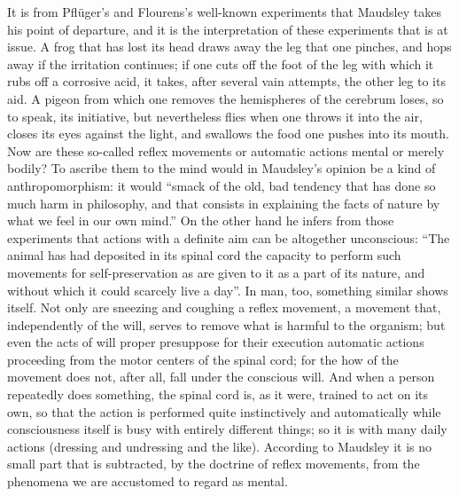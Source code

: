 \documentclass[12pt,a4paper,openany]{book}
\newcommand{\opage}[1]{\marginnote{\footnotesize\textit{[#1]}}}
\begin{document}
It is from Pflüger's and Flourens's well-known experiments that
Maudsley takes his point of departure, and it is the interpretation
of these experiments that is at issue. A frog that has
lost its head draws away the leg that one pinches, and
hops away if the irritation continues; if one cuts off the foot
of the leg with which it rubs off a corrosive acid,
it takes, after several vain attempts, the other leg
to its aid. A pigeon from which one removes the hemispheres
of the cerebrum loses, so to speak, its initiative, but nevertheless flies
when one throws it into the air, closes its eyes against the light,
and swallows the food one pushes into its mouth.
Now are these so-called reflex movements or automatic
actions mental or merely bodily? To ascribe them to the mind
\opage{315}would in Maudsley's opinion be a kind of anthropomorphism:
it would ``smack of the old, bad tendency
that has done so much harm in philosophy, and that
consists in explaining the facts of nature by
what we feel in our own mind.'' On the other hand he infers from
those experiments that actions with a definite aim can be
altogether unconscious: ``The animal has had deposited in its spinal cord
the capacity to perform such movements for self-preservation
as are given to it as a part of its nature, and without
which it could scarcely live a day''. In man, too,
something similar shows itself. Not only are sneezing and coughing
a reflex movement, a movement that, independently of the will,
serves to remove what is harmful to the organism; but
even the acts of will proper presuppose for their execution
automatic actions proceeding from the motor centers of the spinal cord;
for the how of the movement does not, after all, fall under the
conscious will. And when a person repeatedly does
something, the spinal cord is, as it were, trained to
act on its own, so that the action is performed quite
instinctively and automatically while consciousness itself is busy
with entirely different things; so it is with many daily actions
(dressing and undressing and the like). According to
Maudsley it is no small part that is subtracted, by the doctrine of reflex movements,
from the phenomena we are accustomed to regard
as mental.
\end{document}
